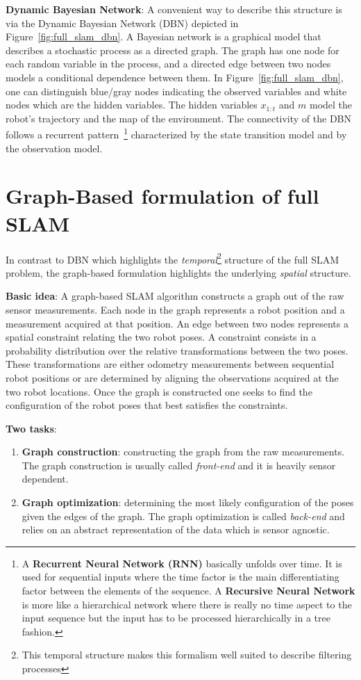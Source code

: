 \textbf{Dynamic Bayesian Network}: A convenient way to describe this structure is via the Dynamic Bayesian Network (DBN) depicted in Figure~\ref{fig:full_slam_dbn}. A Bayesian network is a graphical model that describes a stochastic process as a directed graph. The graph has one node for each random variable in the process, and a directed edge between two nodes models a conditional dependence between them. In Figure~\ref{fig:full_slam_dbn}, one can distinguish blue/gray nodes indicating the observed variables and white nodes which are the hidden variables. The hidden variables $x_{1:t}$ and $m$ model the robot’s trajectory and the map of the environment. The connectivity of the DBN follows a recurrent pattern~\footnote{A \textbf{Recurrent Neural Network (RNN)} basically unfolds over time. It is used for sequential inputs where the time factor is the main differentiating factor between the elements of the sequence. A \textbf{Recursive Neural Network} is more like a hierarchical network where there is really no time aspect to the input sequence but the input has to be processed hierarchically in a tree fashion.} characterized by the state transition model and by the observation model. 

\section{Graph-Based formulation of full SLAM}
In contrast to DBN which highlights the \emph{temporal}\footnote{This temporal structure makes this formalism well suited to describe filtering processes} structure of the full SLAM problem, the graph-based formulation highlights the underlying \emph{spatial} structure.

\textbf{Basic idea}: A graph-based SLAM algorithm constructs a graph out of the raw sensor measurements. Each node in the graph represents a robot position and a measurement acquired at that position. An edge between two nodes represents a spatial constraint relating the two robot poses. A constraint consists in a probability distribution over the relative transformations between the two poses. These transformations are either odometry measurements between sequential robot positions or are determined by aligning the observations acquired at the two robot locations. Once the graph is constructed one seeks to find the configuration of the robot poses that best satisfies the constraints.

\textbf{Two tasks}: 
\begin{enumerate}
    \item \textbf{Graph construction}: constructing the graph from the raw measurements. The graph construction is usually called \emph{front-end} and it is heavily sensor dependent.
    \item \textbf{Graph optimization}: determining the most likely configuration of the poses given the edges of the graph. The graph optimization is called \emph{back-end} and relies on an abstract representation of the data which is sensor agnostic.
\end{enumerate}

